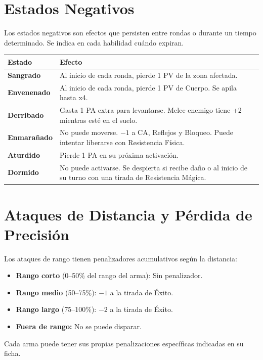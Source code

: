 \section{Estados Negativos}

Los estados negativos son efectos que persisten entre rondas o durante un tiempo determinado. Se indica en cada habilidad cuándo expiran.

\begin{center}
\begin{tabularx}{\linewidth}{|l|X|}
\hline
\rowcolor{GoldRule!20} \textbf{Estado} & \textbf{Efecto} \\ \hline
\textbf{Sangrado} & Al inicio de cada ronda, pierde 1 PV de la zona afectada. \\ \hline
\textbf{Envenenado} & Al inicio de cada ronda, pierde 1 PV de Cuerpo. Se apila hasta x4. \\ \hline
\textbf{Derribado} & Gasta 1 PA extra para levantarse. Melee enemigo tiene +2 mientras esté en el suelo. \\ \hline
\textbf{Enmarañado} & No puede moverse. $-1$ a CA, Reflejos y Bloqueo. Puede intentar liberarse con Resistencia Física. \\ \hline
\textbf{Aturdido} & Pierde 1 PA en su próxima activación. \\ \hline
\textbf{Dormido} & No puede activarse. Se despierta si recibe daño o al inicio de su turno con una tirada de Resistencia Mágica. \\ \hline
\end{tabularx}
\end{center}

\section{Ataques de Distancia y Pérdida de Precisión}

Los ataques de rango tienen penalizadores acumulativos según la distancia:

\begin{itemize}
    \item \textbf{Rango corto} (0--50\% del rango del arma): Sin penalizador.
    \item \textbf{Rango medio} (50--75\%): $-1$ a la tirada de Éxito.
    \item \textbf{Rango largo} (75--100\%): $-2$ a la tirada de Éxito.
    \item \textbf{Fuera de rango:} No se puede disparar.
\end{itemize}

Cada arma puede tener sus propias penalizaciones específicas indicadas en su ficha.
